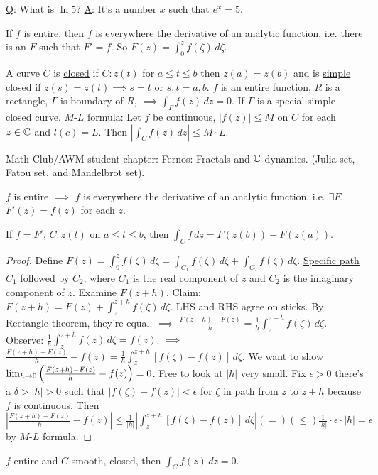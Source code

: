 \documentclass[]{article}
\begin{document}
\underline{Q}: What is $\ln 5$? \underline{A}: It's a number $x$ such that $e^x = 5$.

\begin{theorem}
	If $f$ is entire, then $f$ is everywhere the derivative of an analytic function, i.e. there is an $F$ such that $F' = f$. So $F(z) = \int_0^z f(\zeta) \, d\zeta$.
\end{theorem}

\begin{example}
	 A curve $C$ is \underline{closed} if $C: z(t) $ for $a\leq t\leq b$ then $z(a)=z(b)$ and is \underline{simple closed} if $z(s)=z(t) \implies s=t$ or $s,t=a,b$.
	$f$ is an entire function, $R$ is a rectangle, $\Gamma$ is boundary of $R$, $\implies \int_{\Gamma} f(z) \, dz =0$. If $\Gamma$ is a special simple closed curve.
	$M$-$L$ formula: Let $f$ be continuous, $|f(z)|\leq M$ on $C$ for each $z\in\mathbb{C}$ and $l(c) = L$. Then $\left| \int_C f(z) \, dz \right| \leq M\cdot L$.
\end{example}

Math Club/AWM student chapter: Fernos: Fractals and $\mathbb{C}$-dynamics. (Julia set, Fatou set, and Mandelbrot set).

\begin{theorem}
	 $f$ is entire $\implies$ $f$ is everywhere the derivative of an analytic function. i.e. $\exists F$, $F'(z) = f(z)$ for each $z$.
\end{theorem}
\begin{recall}
	[FTC] If $f = F'$, $C:z(t)$ on $a\leq t \leq b$, then $\int_C f \, dz = F(z(b)) - F(z(a))$.
\end{recall}
\begin{proof}
	Define $F(z) = \int_0^z f(\zeta) \, d\zeta = \int_{C_1} f(\zeta) \, d\zeta + \int_{C_2} f(\zeta) \, d\zeta $. \underline{Specific path} $C_1$ followed by $C_2$, where $C_1$ is the real component of $z$ and $C_2$ is the imaginary component of $z$.
	Examine $F(z+h)$. Claim: $F(z+h) = F(z) + \int_z^{z+h} f(\zeta) \, d\zeta$.
	LHS and RHS agree on sticks.
	By Rectangle theorem, they're equal.
	$\implies$ $\frac{F(z+h) - F(z)}{h} = \frac{1}{h} \int_z^{z+h} f(\zeta) \, d\zeta$. \underline{Observe}: $\frac{1}{h} \int_z^{z+h} f(z) \, d\zeta = f(z)$.
	$\implies$ $\frac{F(z+h) - F(z)}{h} - f(z) = \frac{1}{h} \int_z^{z+h} [ f(\zeta) - f(z)] \, d\zeta$. We want to show $\lim_{h\rightarrow 0} \left( \frac{F(z+h)-F(z)}{h} - f(z) \right) = 0$. Free to look at $|h|$ very small. Fix $\epsilon>0$ there's a $\delta>|h|>0$ such that $|f(\zeta) - f(z)|<\epsilon$ for $\zeta$ in path from $z$ to $z+h$ because $f$ is continuous. Then $\left| \frac{F(z+h)-F(z)}{h} - f(z) \right| \leq \frac{1}{|h|} \left| \int_z^{z+h} [f(\zeta)-f(z)] \, d\zeta \right| (=) (\leq) \frac{1}{|h|} \cdot \epsilon \cdot |h| = \epsilon$ by $M$-$L$ formula.
\end{proof}
\begin{corollary}
	 $f$ entire and $C$ smooth, closed, then $\int_C f(z) \, dz = 0$.
\end{corollary}
\end{document}
